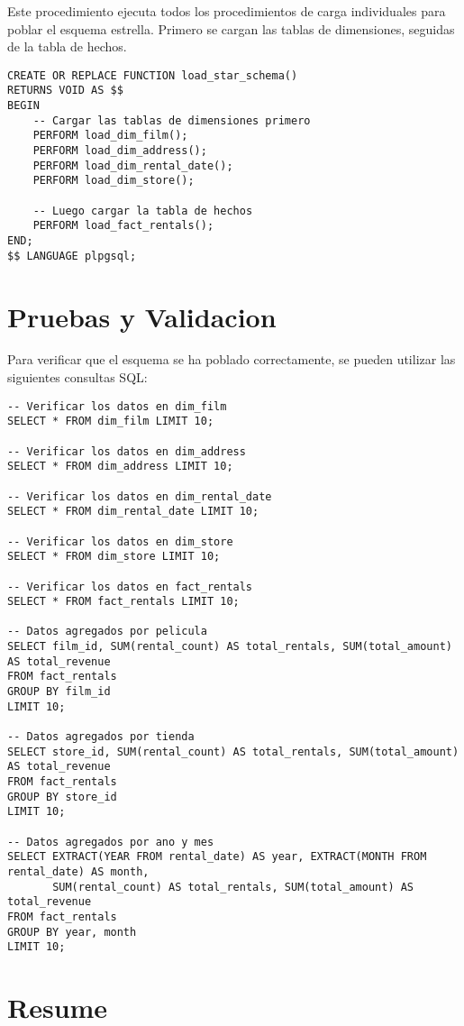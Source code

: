 \documentclass{article}
\begin{document}
Este procedimiento ejecuta todos los procedimientos de carga individuales para poblar el esquema estrella. Primero se cargan las tablas de dimensiones, seguidas de la tabla de hechos.

\begin{lstlisting}
CREATE OR REPLACE FUNCTION load_star_schema()
RETURNS VOID AS $$
BEGIN
    -- Cargar las tablas de dimensiones primero
    PERFORM load_dim_film();
    PERFORM load_dim_address();
    PERFORM load_dim_rental_date();
    PERFORM load_dim_store();

    -- Luego cargar la tabla de hechos
    PERFORM load_fact_rentals();
END;
$$ LANGUAGE plpgsql;
\end{lstlisting}

\newpage
\section{Pruebas y Validacion}

Para verificar que el esquema se ha poblado correctamente, se pueden utilizar las siguientes consultas SQL:

\begin{lstlisting}
-- Verificar los datos en dim_film
SELECT * FROM dim_film LIMIT 10;

-- Verificar los datos en dim_address
SELECT * FROM dim_address LIMIT 10;

-- Verificar los datos en dim_rental_date
SELECT * FROM dim_rental_date LIMIT 10;

-- Verificar los datos en dim_store
SELECT * FROM dim_store LIMIT 10;

-- Verificar los datos en fact_rentals
SELECT * FROM fact_rentals LIMIT 10;

-- Datos agregados por pelicula
SELECT film_id, SUM(rental_count) AS total_rentals, SUM(total_amount) AS total_revenue
FROM fact_rentals
GROUP BY film_id
LIMIT 10;

-- Datos agregados por tienda
SELECT store_id, SUM(rental_count) AS total_rentals, SUM(total_amount) AS total_revenue
FROM fact_rentals
GROUP BY store_id
LIMIT 10;

-- Datos agregados por ano y mes
SELECT EXTRACT(YEAR FROM rental_date) AS year, EXTRACT(MONTH FROM rental_date) AS month, 
       SUM(rental_count) AS total_rentals, SUM(total_amount) AS total_revenue
FROM fact_rentals
GROUP BY year, month
LIMIT 10;
\end{lstlisting}

\newpage
\section{Resume}
\end{document}
